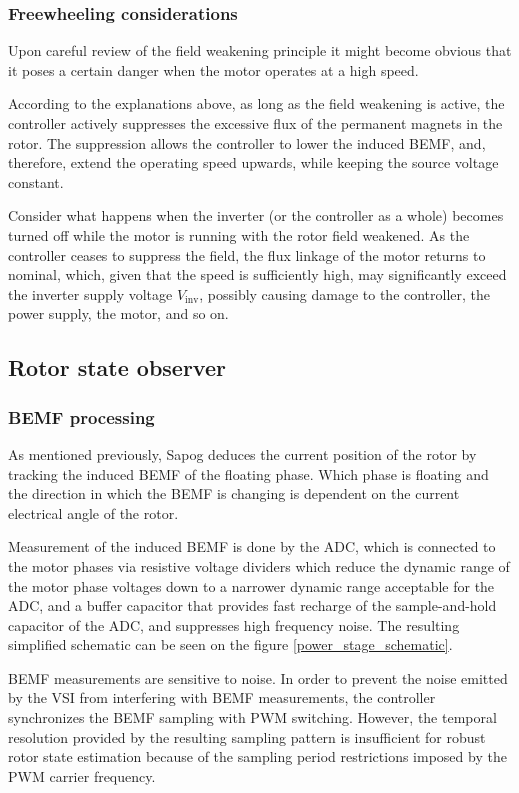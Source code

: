 \documentclass{zubaxdoc}
\begin{document}
\subsubsection{Freewheeling considerations}

Upon careful review of the field weakening principle it might become obvious that it poses a certain danger
when the motor operates at a high speed.

According to the explanations above, as long as the field weakening is active,
the controller actively suppresses the excessive flux of the permanent magnets in the rotor.
The suppression allows the controller to lower the induced BEMF, and, therefore,
extend the operating speed upwards, while keeping the source voltage constant.

Consider what happens when the inverter (or the controller as a whole) becomes turned off while the
motor is running with the rotor field weakened.
As the controller ceases to suppress the field, the flux linkage of the motor returns to nominal,
which, given that the speed is sufficiently high, may significantly exceed the inverter supply
voltage $V_\text{inv}$, possibly causing damage to the controller, the power supply, the motor, and so on.

\subsection{Rotor state observer}

\subsubsection{BEMF processing}

As mentioned previously, Sapog deduces the current position of the rotor by tracking the induced BEMF
of the floating phase.
Which phase is floating and the direction in which the BEMF is changing is dependent on the current electrical
angle of the rotor.

Measurement of the induced BEMF is done by the ADC, which is connected to the motor phases via
resistive voltage dividers which reduce the dynamic range of the motor phase voltages down to a narrower
dynamic range acceptable for the ADC,
and a buffer capacitor that provides fast recharge of the sample-and-hold capacitor of the ADC,
and suppresses high frequency noise.
The resulting simplified schematic can be seen on the figure \ref{power_stage_schematic}.

BEMF measurements are sensitive to noise.
In order to prevent the noise emitted by the VSI from interfering with BEMF measurements,
the controller synchronizes the BEMF sampling with PWM switching.
However, the temporal resolution provided by the resulting sampling pattern is insufficient for robust
rotor state estimation because of the sampling period restrictions imposed by the
PWM carrier frequency.
\end{document}

